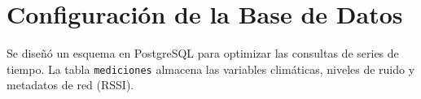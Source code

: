 \section{Configuración de la Base de Datos}
Se diseñó un esquema en PostgreSQL para optimizar las consultas de series de tiempo. La tabla \texttt{mediciones} almacena las variables climáticas, niveles de ruido y metadatos de red (RSSI).
